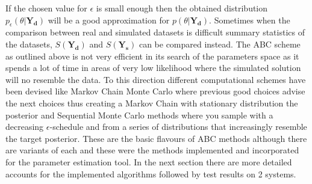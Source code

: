 If the chosen value for $\epsilon$ is small enough then the obtained distribution $p_\epsilon(\theta | \mathbf{Y_{d}})$ will be a good approximation for $p(\theta | \mathbf{Y_{d}})$. Sometimes when the comparison between real and simulated datasets is difficult summary statistics of the datasets, $S(\mathbf{Y_{d}})$ and $S(\mathbf{Y_{s}})$ can be compared instead. The ABC scheme as outlined above is not very efficient in its search of the parameters space as it spends a lot of time in areas of very low likelihood where the simulated solution will no resemble the data. To this direction different computational schemes have been devised like Markov Chain Monte Carlo\cite[] {marjoram2003markov} where previous good choices advise the next choices thus creating a Markov Chain with stationary distribution the posterior and Sequential Monte Carlo methods where you sample with a decreasing $\epsilon$-schedule and from a series of distributions that increasingly resemble the target posterior\cite[] {del2006sequential, sisson2007sequential, toni2009abc}. These are the basic flavours of ABC methods although there are variants of each and these were the methods implemented and incorporated for the parameter estimation tool. In the next section there are more detailed accounts for the implemented algorithms followed by test results on 2 systems.

